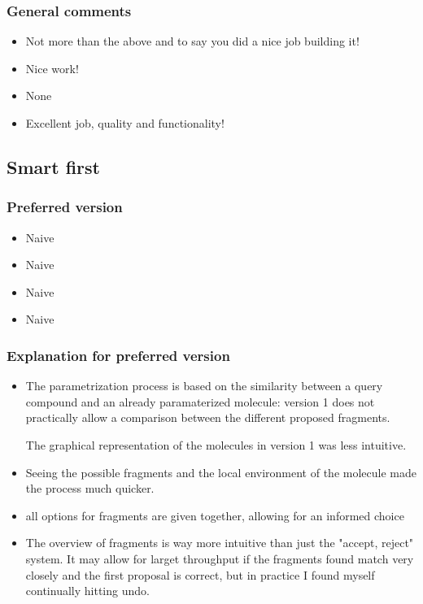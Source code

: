 \subsubsection{General comments}
\begin{itemize}
\item Not more than the above and to say you did a nice job building it!

\item Nice work!

\item None

\item Excellent job, quality and functionality!

\end{itemize}


\subsection{Smart first}
\subsubsection{Preferred version}
\begin{itemize}
\item Naive

\item Naive

\item Naive

\item Naive

\end{itemize}


\subsubsection{Explanation for preferred version}
\begin{itemize}
\item The parametrization process is based on the similarity between a query compound and an already paramaterized molecule: version 1 does not practically allow a comparison between the different proposed fragments.

The graphical representation of the molecules in version 1 was less intuitive.

\item Seeing the possible fragments and the local environment of the molecule made the process much quicker. 

\item all options for fragments are given together, allowing for an informed choice

\item The overview of fragments is way more intuitive than just the "accept, reject" system. It may allow for larget throughput if the fragments found match very closely and the first proposal is correct, but in practice I found myself continually hitting undo.

\end{itemize}


